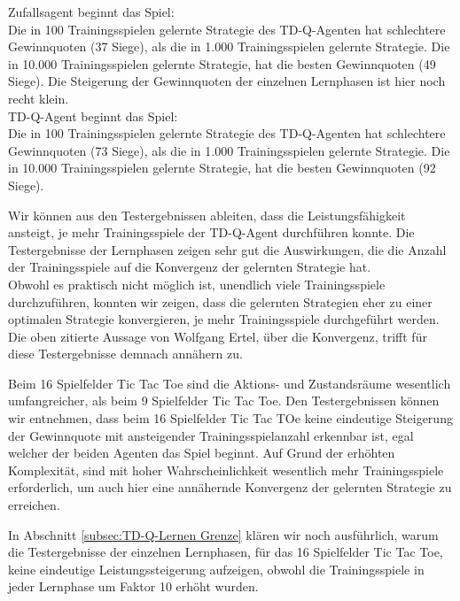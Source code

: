 
Zufallsagent beginnt das Spiel: \\
Die in 100 Trainingsspielen gelernte Strategie des TD-Q-Agenten hat schlechtere Gewinnquoten (37 Siege), als die in 1.000 Trainingsspielen gelernte Strategie. Die in 10.000 Trainingsspielen gelernte Strategie, hat die besten Gewinnquoten (49 Siege). Die Steigerung der Gewinnquoten der einzelnen Lernphasen ist hier noch recht klein. \\

TD-Q-Agent beginnt das Spiel: \\
Die in 100 Trainingsspielen gelernte Strategie des TD-Q-Agenten hat schlechtere Gewinnquoten (73 Siege), als die in 1.000 Trainingsspielen gelernte Strategie. Die in 10.000 Trainingsspielen gelernte Strategie, hat die besten Gewinnquoten (92 Siege).  

Wir können aus den Testergebnissen ableiten, dass die Leistungsfähigkeit ansteigt, je mehr Trainingsspiele der TD-Q-Agent durchführen konnte. Die Testergebnisse der Lernphasen zeigen sehr gut die Auswirkungen, die die Anzahl der Trainingsspiele auf die Konvergenz der gelernten Strategie hat. \\

Obwohl es praktisch nicht möglich ist, unendlich viele Trainingsspiele durchzuführen, konnten wir zeigen, dass die gelernten Strategien eher zu einer optimalen Strategie konvergieren, je mehr Trainingsspiele durchgeführt werden. Die oben zitierte Aussage von Wolfgang Ertel, über die Konvergenz, trifft für diese Testergebnisse demnach annähern zu. \\


Beim 16 Spielfelder Tic Tac Toe sind die Aktions- und Zustandsräume wesentlich umfangreicher, als beim 9 Spielfelder Tic Tac Toe. Den Testergebnissen können wir entnehmen, dass beim 16 Spielfelder Tic Tac TOe keine eindeutige Steigerung der Gewinnquote mit ansteigender Trainingsspielanzahl erkennbar ist, egal welcher der beiden Agenten das Spiel beginnt. Auf Grund der erhöhten Komplexität, sind mit hoher Wahrscheinlichkeit wesentlich mehr Trainingsspiele erforderlich, um auch hier eine annähernde Konvergenz der gelernten Strategie zu erreichen.

In Abschnitt \ref{subsec:TD-Q-Lernen Grenze} klären wir noch ausführlich, warum die Testergebnisse der einzelnen Lernphasen, für das 16 Spielfelder Tic Tac Toe, keine eindeutige Leistungssteigerung aufzeigen, obwohl die Trainingsspiele in jeder Lernphase um Faktor 10 erhöht wurden. \\

